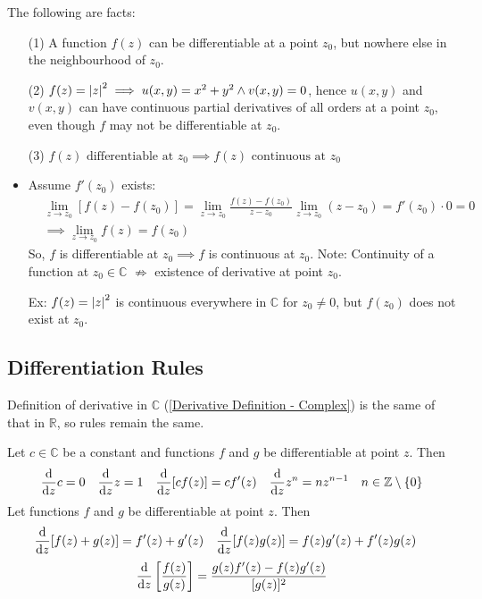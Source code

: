 \documentclass[12pt, english]{book}
\makeatletter
\renewenvironment{proof}[1][\proofname]{\par
	\pushQED{\qed}%
	\normalfont \topsep6\p@\@plus6\p@\relax
	\list{}{%
		\settowidth{\leftmargin}{\itshape\proofname:\hskip\labelsep}%
		\setlength{\labelwidth}{0pt}%
		\setlength{\itemindent}{-\leftmargin}%
	}%
	\item[\hskip\labelsep\itshape#1\@addpunct{:}]\ignorespaces
	}{ \popQED\endlist\@endpefalse}
\makeatother
\begin{document}
	\begin{remark}
		The following are facts:
		\begin{itemize}
			\item[(1)] A function $f(z)$ can be differentiable at a point $z_0$, but nowhere else in the neighbourhood of $z_0$.
			\item[(2)] \(f(z) = \abs{z}^2 \implies u(x,y) = x^2 + y^2 \land v(x,y) = 0 \), hence $u(x,y)$ and $v(x,y)$ can have continuous partial derivatives of all orders at a point $z_0$, even though $f$ may not be differentiable at $z_0$.
			\item[(3)]
			\( f(z) \text{ differentiable at } z_0 \implies f(z) \text{ continuous at } z_0 \)
			\begin{proof}
				Assume \( f'(z_0) \) exists: 
				\begin{align*}
					&\lim_{z \rightarrow z_0} [f(z) - f(z_0)] = \lim_{z \rightarrow z_0} \frac{f(z) - f(z_0)}{z - z_0} \lim_{z \rightarrow z_0} (z - z_0) = f'(z_0) \cdot 0 = 0\\
					&\implies \lim_{z \rightarrow z_0} f(z) = f(z_0)
				\end{align*}
			So, $f$ is differentiable at \(z_0 \implies f \) is continuous at \(z_0\).
			\end{proof}
			Note: Continuity of a function  at \(z_0 \in \mathbb{C}\) $\nRightarrow$ existence of derivative at point \(z_0\). 
			
			Ex: \(f(z) = \abs{z}^2 \) is continuous everywhere in $\mathbb{C}$ for \(z_0 \neq 0\), but \(f(z_0) \) does not exist at \(z_0\). 
		\end{itemize}
	\end{remark}

	\subsection{Differentiation Rules} \label{Differentiation Rules Subsection - Complex}
	Definition of derivative in \(\mathbb{C}\) (\cref{Derivative Definition - Complex}) is the same of that in \(\mathbb{R}\), so rules remain the same.
	
	Let \(c \in \mathbb{C}\) be a constant and functions \(f\) and \(g\) be differentiable at point \(z\). Then
	\begin{align*}
		\dv{z} c &= 0 & \dv{z} z &= 1 & \dv{z} [cf(z)] &= cf'(z) & \dv{z} z^n &= nz^{n-1} & n \in \mathbb{Z}\setminus\{0\}
	\end{align*}
	Let functions \(f\) and \(g\) be differentiable at point \(z\). Then
	\begin{align*}
		\dv{z} [f(z) + g(z)] &= f'(z) + g'(z) & \dv{z}[f(z)g(z)] &= f(z)g'(z) + f'(z)g(z) 
	\end{align*}
	\begin{align*}
		\dv{z}\left[\frac{f(z)}{g(z)}\right] = \frac{g(z)f'(z) - f(z)g'(z)}{[g(z)]^2}
	\end{align*}
	
\end{document}
